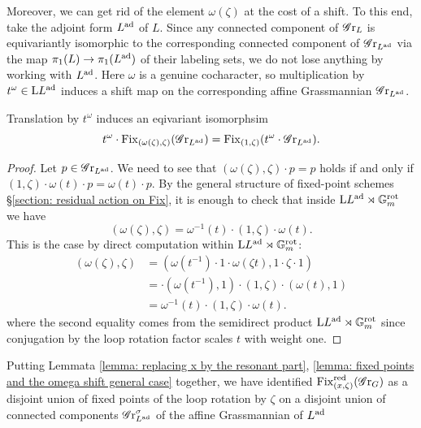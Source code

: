 Moreover, we can get rid of the element $\omega(\zeta)$ at the cost of a shift. 
To this end, take the adjoint form $L^{\operatorname{ad}}$ of $L$. Since any connected component of $\operatorname{\mathscr{G}r}_L$ is equivariantly isomorphic to the corresponding connected component of $\operatorname{\mathscr{G}r}_{L^{\operatorname{ad}}}$ via the map $\pi_1(L) \to \pi_1(L^{\operatorname{ad}})$ of their labeling sets, we do not lose anything by working with $L^{\operatorname{ad}}$. Here $\omega$ is a genuine cocharacter, so multiplication by $t^{\omega} \in \mathrm{L} L^{\operatorname{ad}}$ induces a shift map on the corresponding affine Grassmannian $\operatorname{\mathscr{G}r}_{L^{\operatorname{ad}}}$.

\begin{lemma}\label{lemma: fixed points and the omega shift general case}
Translation by $t^{\omega}$ induces an eqivariant isomorphsim 
\begin{equation}
t^{\omega} \cdot \operatorname{Fix}_{(\omega(\zeta), \zeta)}(\operatorname{\mathscr{G}r}_{L^{\operatorname{ad}}}) = \operatorname{Fix}_{(1, \zeta)}(t^{\omega} \cdot \operatorname{\mathscr{G}r}_{L^{\operatorname{ad}}}).   
\end{equation}
\end{lemma}
\begin{proof}
Let $p \in \operatorname{\mathscr{G}r}_{L^{\operatorname{ad}}}$. We need to see that $(\omega(\zeta), \zeta)\cdot p = p$ holds if and only if $(1, \zeta) \cdot \omega(t) \cdot p = \omega(t) \cdot p$. By the general structure of fixed-point schemes \S \ref{section: residual action on Fix}, it is enough to check that inside $\mathrm{L} L^{\operatorname{ad}} \rtimes \mathbb{G}_m^{\mathrm{rot}}$ we have
\begin{equation}
 (\omega(\zeta), \zeta) = \omega^{-1}(t) \cdot (1, \zeta) \cdot \omega(t).
\end{equation}
This is the case by direct computation within $\mathrm{L} L^{\operatorname{ad}} \rtimes \mathbb{G}_m^{\mathrm{rot}}$:
\begin{align*}
(\omega(\zeta), \zeta)
&= (\omega(t^{-1}) \cdot 1 \cdot \omega(\zeta t), 1 \cdot \zeta \cdot 1)\\
&= \cdot (\omega(t^{-1}), 1) \cdot (1, \zeta) \cdot (\omega(t), 1)\\
&= \omega^{-1}(t) \cdot (1, \zeta) \cdot \omega(t).
\end{align*}
where the second equality comes from the semidirect product $\mathrm{L} L^{\operatorname{ad}} \rtimes \mathbb{G}_m^{\mathrm{rot}}$ since conjugation by the loop rotation factor scales $t$ with weight one.
\end{proof}



Putting Lemmata \ref{lemma: replacing x by the resonant part}, \ref{lemma: fixed points and the omega shift general case} together, we have identified $\operatorname{Fix}^{\operatorname{red}}_{(x, \zeta)}(\operatorname{\mathscr{G}r}_G)$ as a disjoint union of fixed points of the loop rotation by $\zeta$ on a disjoint union of connected components $\operatorname{\mathscr{G}r}_{L^{\operatorname{ad}}}^{\sigma}$ of the affine Grassmannian of $L^{\operatorname{ad}}$

